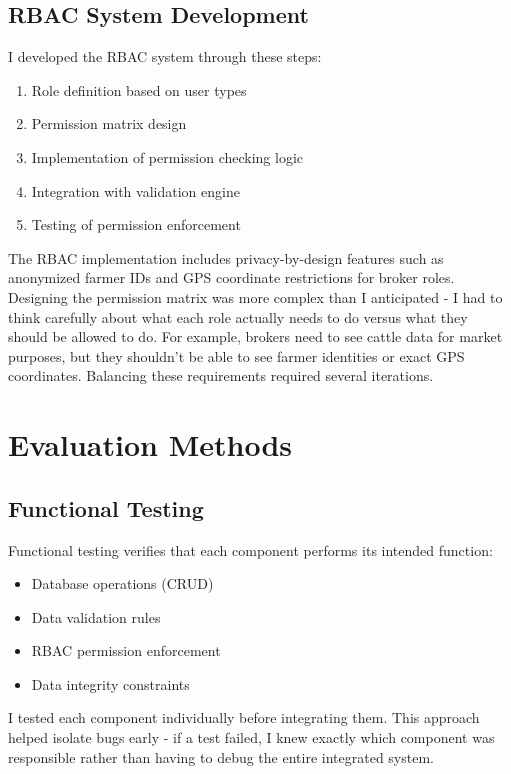 \subsection{RBAC System Development}

I developed the RBAC system through these steps:

\begin{enumerate}
    \item Role definition based on user types
    \item Permission matrix design
    \item Implementation of permission checking logic
    \item Integration with validation engine
    \item Testing of permission enforcement
\end{enumerate}

The RBAC implementation includes privacy-by-design features such as anonymized farmer IDs and GPS coordinate restrictions for broker roles. Designing the permission matrix was more complex than I anticipated - I had to think carefully about what each role actually needs to do versus what they should be allowed to do. For example, brokers need to see cattle data for market purposes, but they shouldn't be able to see farmer identities or exact GPS coordinates. Balancing these requirements required several iterations.

\section{Evaluation Methods}

\subsection{Functional Testing}

Functional testing verifies that each component performs its intended function:

\begin{itemize}
    \item Database operations (CRUD)
    \item Data validation rules
    \item RBAC permission enforcement
    \item Data integrity constraints
\end{itemize}

I tested each component individually before integrating them. This approach helped isolate bugs early - if a test failed, I knew exactly which component was responsible rather than having to debug the entire integrated system.

